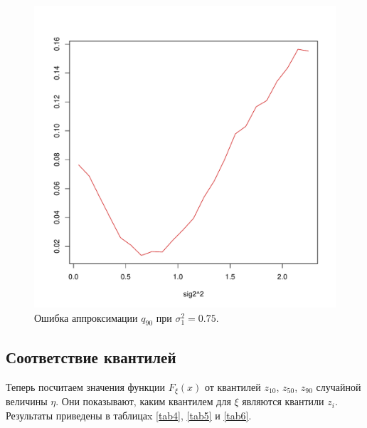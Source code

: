 \documentclass[specialist, substylefile = spbu.rtx,
subf,href,colorlinks=true, 12pt]{disser}
\begin{document}
\begin{figure}[!hhh]
	\begin{center}
		\begin{minipage}[h]{0.8\linewidth}
			\includegraphics[width=1\linewidth]{img/gr_neww_3.pdf}
			\caption{Ошибка аппроксимации $q_{90}$ при $\sigma_{1}^{2} = 0.75$.} %
			\label{ris4_3} %
		\end{minipage}	
	\end{center}
\end{figure}

\subsection{Соответствие квантилей}

Теперь посчитаем значения функции $F_{\xi}(x)$ от квантилей $z_{10}$, $z_{50}$, $z_{90}$ случайной величины $\eta$. Они показывают, каким квантилем для $\xi$ являются квантили $z_{i}$. Результаты приведены в таблицаx \ref{tab4}, \ref{tab5} и \ref{tab6}.
\end{document}
